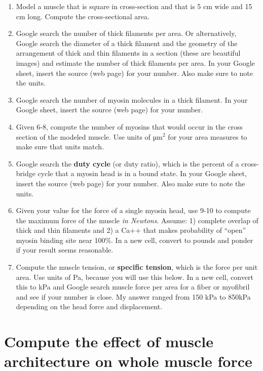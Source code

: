 \documentclass[]{book}
\providecommand{\tightlist}{%
  \setlength{\itemsep}{0pt}\setlength{\parskip}{0pt}}
\begin{document}
\begin{enumerate}
\def\labelenumi{\arabic{enumi}.}
\setcounter{enumi}{5}
\tightlist
\item
  Model a muscle that is square in cross-section and that is 5 cm wide
  and 15 cm long. Compute the cross-sectional area.
\item
  Google search the number of thick filaments per area. Or
  alternatively, Google search the diameter of a thick filament and the
  geometry of the arrangement of thick and thin filaments in a section
  (these are beautiful images) and estimate the number of thick
  filaments per area. In your Google sheet, insert the source (web page)
  for your number. Also make sure to note the units.
\item
  Google search the number of myosin molecules in a thick filament. In
  your Google sheet, insert the source (web page) for your number.
\item
  Given 6-8, compute the number of myosins that would occur in the cross
  section of the modeled muscle. Use units of µm\(^2\) for your area
  measures to make sure that units match.
\item
  Google search the \textbf{duty cycle} (or duty ratio), which is the
  percent of a cross-bridge cycle that a myosin head is in a bound
  state. In your Google sheet, insert the source (web page) for your
  number. Also make sure to note the units.
\item
  Given your value for the force of a single myosin head, use 9-10 to
  compute the maximum force of the muscle \emph{in Newtons}. Assume: 1)
  complete overlap of thick and thin filaments and 2) a Ca++ that makes
  probability of ``open'' myosin binding site near 100\%. In a new cell,
  convert to pounds and ponder if your result seems reasonable.
\item
  Compute the muscle tension, or \textbf{specific tension}, which is the
  force per unit area. Use units of Pa, because you will use this below.
  In a new cell, convert this to kPa and Google search muscle force per
  area for a fiber or myofibril and see if your number is close. My
  answer ranged from 150 kPa to 850kPa depending on the head force and
  displacement.
\end{enumerate}

\section{Compute the effect of muscle architecture on whole muscle
force}\label{compute-the-effect-of-muscle-architecture-on-whole-muscle-force}
\end{document}
